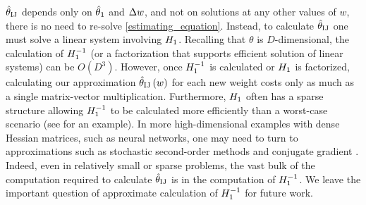 $\hat{\theta}_{\textrm{IJ}}$ depends only on $\hat{\theta}_{1}$ and $\Delta w$, and not on
solutions at any other values of $w$, there is no
need to re-solve \eqref{estimating_equation}. Instead, to calculate $\hat{\theta}_{\textrm{IJ}}$
one must solve a linear system involving $H_{1}$. Recalling that $\theta$ is
$D$-dimensional, the calculation of $H_{1}^{-1}$ (or a factorization that
supports efficient solution of linear systems) can be $O\left(D^{3}\right)$.
However, once $H_{1}^{-1}$ is calculated or $H_{1}$ is factorized, calculating our approximation
$\hat{\theta}_{\textrm{IJ}}\left(w\right)$ for each new weight costs only as
much as a single matrix-vector multiplication. Furthermore, $H_{1}$ often has a
sparse structure allowing $H_{1}^{-1}$ to be calculated more efficiently than a
worst-case scenario (see  for an example). In more
high-dimensional examples with dense Hessian matrices, such as neural networks,
one may need to turn to approximations such as stochastic second-order methods
\citep{KohL17, agarwal:2016:lissa} and conjugate gradient
\citep{wright:1999:optimization}. Indeed, even in relatively small or sparse
problems, the vast bulk of the computation required to calculate $\hat{\theta}_{\textrm{IJ}}$ is
in the computation of $H_{1}^{-1}$. We leave the important question of
approximate calculation of $H_{1}^{-1}$ for future work.
